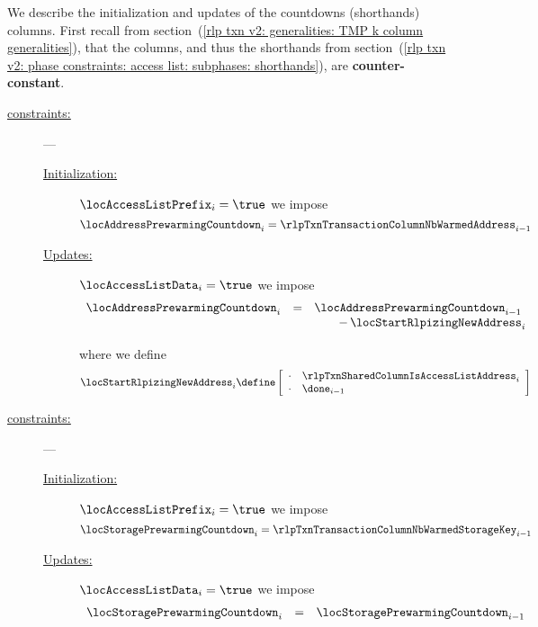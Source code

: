 We describe the initialization and updates of the countdowns (shorthands) columns.
First recall
from section~(\ref{rlp txn v2: generalities: TMP k column generalities}),
that the  columns, and thus the shorthands
from section~(\ref{rlp txn v2: phase constraints: access list: subphases: shorthands}),
are \textbf{counter-constant}.
\begin{description}
	\item[\underline{\underline{\locAddressPrewarmingCountdown{} constraints:}}] ---
		\begin{description}
			\item[\underline{Initialization:}]
				\If $\locAccessListPrefix _{i} = \true$ \Then
				we impose
				\[
					\locAddressPrewarmingCountdown _{i} = \rlpTxnTransactionColumnNbWarmedAddress _{i - 1}
				\]
			\item[\underline{Updates:}]
				\If $\locAccessListData _{i} = \true$ \Then
				we impose
				\[
					\begin{array}{lcl}
						\locAddressPrewarmingCountdown _{i} & = & \locAddressPrewarmingCountdown             _{i - 1}          \\
						&   & \qquad - \, \locStartRlpizingNewAddress    _{i} \vspace{2mm} \\
					\end{array}
				\]
				where we define
				\[
					\locStartRlpizingNewAddress _{i} \define
					\left[ \begin{array}{cl}
						\cdot & \rlpTxnSharedColumnIsAccessListAddress _{i} \\
						\cdot & \done _{i - 1}                              \\
					\end{array} \right]
				\]
		\end{description}
	\item[\underline{\underline{\locStoragePrewarmingCountdown{} constraints:}}] ---
		\begin{description}
			\item[\underline{Initialization:}]
				\If $\locAccessListPrefix _{i} = \true$ \Then
				we impose
				\[
					\locStoragePrewarmingCountdown _{i} = \rlpTxnTransactionColumnNbWarmedStorageKey  _{i - 1}
				\]
			\item[\underline{Updates:}]
				\If $\locAccessListData _{i} = \true$ \Then
				we impose
				\[
					\begin{array}{lcl}
						\locStoragePrewarmingCountdown _{i} & = & \locStoragePrewarmingCountdown             _{i - 1} \\

\end{array}\]
\end{description}
\end{description}
